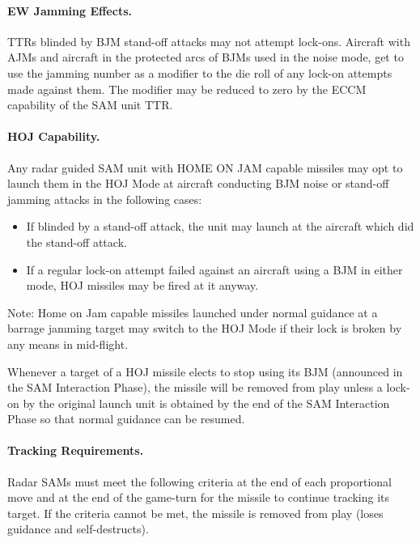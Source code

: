 \paragraph{EW Jamming Effects.} TTRs blinded by BJM stand-off attacks may not attempt lock-ons. Aircraft with AJMs and aircraft in the protected arcs of BJMs used in the noise mode, get to use the jamming number as a modifier to the die roll of any lock-on attempts made against them. The modifier may be reduced to zero by the ECCM capability of the SAM unit TTR.

\paragraph{HOJ Capability.} Any radar guided SAM unit with HOME ON JAM capable missiles may opt to launch them in the HOJ Mode at aircraft conducting BJM noise or stand-off jamming attacks in the following cases:

\begin{itemize}

    \item If blinded by a stand-off attack, the unit may launch at the aircraft which did the stand-off attack.

    \item If a regular lock-on attempt failed against an aircraft using a BJM in either mode, HOJ missiles may be fired at it anyway.

\end{itemize}

Note: Home on Jam capable missiles launched under normal guidance at a barrage jamming target may switch to the HOJ Mode if their lock is broken by any means in mid-flight.

Whenever a target of a HOJ missile elects to stop using its BJM (announced in the SAM Interaction Phase), the missile will be removed from play unless a lock-on by the original launch unit is obtained by the end of the SAM Interaction Phase so that normal guidance can be resumed.

\paragraph{Tracking Requirements.} Radar SAMs must meet the following criteria at the end of each proportional move and at the end of the game-turn for the missile to continue tracking its target. If the criteria cannot be met, the missile is removed from play (loses guidance and self-destructs).

